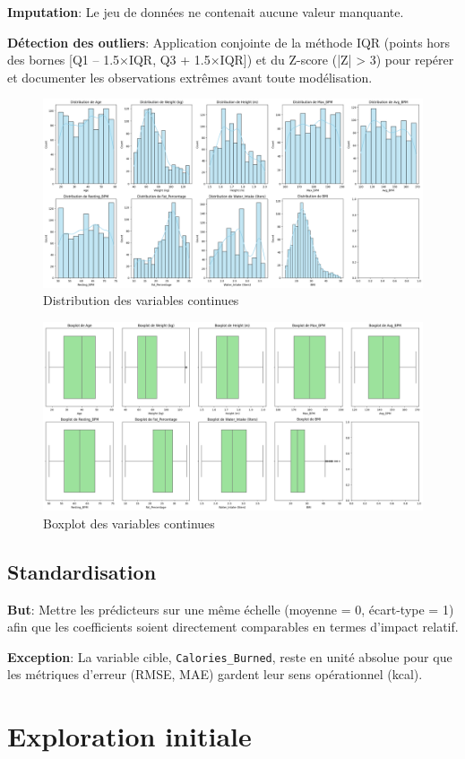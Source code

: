 \documentclass[12pt,a4paper]{article}
\begin{document}
\textbf{Imputation}:
Le jeu de données ne contenait aucune valeur manquante.

\textbf{Détection des outliers}:
Application conjointe de la méthode IQR (points hors des bornes [Q1 – 1.5×IQR, Q3 + 1.5×IQR]) et du Z-score (|Z| > 3) pour repérer et documenter les observations extrêmes avant toute modélisation.

\begin{figure}[H]
  \centering
  \includegraphics[width=0.7\linewidth]{distribution.png}
  \caption{Distribution des variables continues}
\end{figure}

\begin{figure}[H]
  \centering
  \includegraphics[width=0.7\linewidth]{boxplot.png}
  \caption{Boxplot des variables continues}
\end{figure}

\subsection{Standardisation}
\textbf{But}:
Mettre les prédicteurs sur une même échelle (moyenne = 0, écart-type = 1) afin que les coefficients soient directement comparables en termes d’impact relatif.

\textbf{Exception}:
La variable cible, \texttt{Calories\_Burned}, reste en unité absolue pour que les métriques d’erreur (RMSE, MAE) gardent leur sens opérationnel (kcal).


\section{Exploration initiale}
\end{document}
